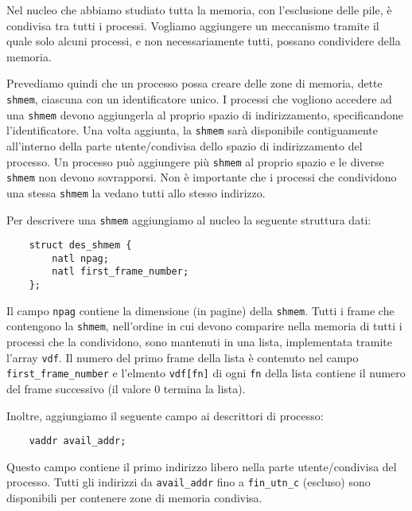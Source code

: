 Nel nucleo che abbiamo studiato tutta la memoria, con l'esclusione
delle pile, \`e condivisa tra tutti i processi. Vogliamo aggiungere un
meccanismo tramite il quale solo alcuni processi, e non necessariamente
tutti, possano condividere della memoria.

Prevediamo quindi che un processo possa creare delle zone di memoria, dette 
\verb|shmem|, ciascuna con
un identificatore unico. I processi che vogliono accedere ad una \verb|shmem|
devono aggiungerla al proprio spazio di indirizzamento, specificandone l'identificatore.
Una volta aggiunta, la \verb|shmem| sar\`a disponibile contiguamente all'interno della parte
utente/condivisa dello spazio di indirizzamento del processo. Un processo pu\`o aggiungere
pi\`u \verb|shmem| al proprio spazio e le diverse \verb|shmem| non devono sovrapporsi.
Non \`e importante che i processi che condividono una stessa \verb|shmem| la vedano tutti
allo stesso indirizzo.

Per descrivere una \verb|shmem| aggiungiamo al nucleo la seguente struttura dati:

\begin{verbatim}
    struct des_shmem {
        natl npag;
        natl first_frame_number;
    };
\end{verbatim}

Il campo \verb|npag| contiene la dimensione (in pagine) della \verb|shmem|.
Tutti i frame che contengono la \verb|shmem|, nell'ordine in cui
devono comparire nella memoria di tutti i processi che la condividono,
sono mantenuti in una lista, implementata tramite l'array \verb|vdf|. Il numero del
primo frame della lista \`e contenuto nel campo \verb|first_frame_number| e l'elmento
\verb|vdf[fn]| di ogni \verb|fn| della lista contiene il numero del frame successivo
(il valore 0 termina la lista).

Inoltre, aggiungiamo il seguente campo ai descrittori di processo:

\begin{verbatim}
    vaddr avail_addr;
\end{verbatim}

Questo campo contiene il primo indirizzo libero nella parte utente/condivisa del processo.
Tutti gli indirizzi da \verb|avail_addr| fino a \verb|fin_utn_c| (escluso) sono disponibili
per contenere zone di memoria condivisa.

